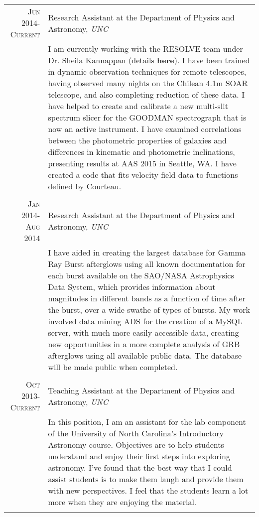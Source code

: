 \documentclass[a4paper,10pt]{article} %
\begin{document}
\begin{tabular}{r|p{11cm}}
\textsc{Jun 2014-Current} & Research Assistant at the Department of Physics and Astronomy, \emph{UNC} \\ 
& \footnotesize{I am currently working with the RESOLVE team under Dr. Sheila Kannappan (details \textbf{\href{http://resolve.astro.unc.edu/}{here}}). I have been trained in dynamic observation techniques for remote telescopes, having observed many nights on the Chilean 4.1m SOAR telescope, and also completing reduction of these data. I have helped to create and calibrate a new multi-slit spectrum slicer for the GOODMAN spectrograph that is now an active instrument. I have examined correlations between the photometric properties of galaxies and differences in kinematic and photometric inclinations, presenting results at AAS 2015 in Seattle, WA. I have created a code that fits velocity field data to functions defined by Courteau.}\\
\multicolumn{2}{c}{} \\


\textsc{Jan 2014-Aug 2014} & Research Assistant at the Department of Physics and Astronomy, \emph{UNC} \\ 
& \footnotesize{I have aided in creating the largest database for Gamma Ray Burst afterglows using all known documentation for each burst available on the SAO/NASA Astrophysics Data System, which provides information about magnitudes in different bands as a function of time after the burst, over a wide swathe of types of bursts. My work involved data mining ADS for the creation of a MySQL server, with much more easily accessible data, creating new opportunities in a more complete analysis of GRB afterglows using all available public data. The database will be made public when completed.}\\
\multicolumn{2}{c}{} \\


\textsc{Oct 2013-Current} & Teaching Assistant at the Department of Physics and Astronomy, \emph{UNC} \\
& \footnotesize{In this position, I am an assistant for the lab component of the University of North Carolina's Introductory Astronomy course. Objectives are to help students understand and enjoy their first steps into exploring astronomy. I've found that the best way that I could assist students is to make them laugh and provide them with new perspectives. I feel that the students learn a lot more when they are enjoying the material.}\\
\multicolumn{2}{c}{} \\


\end{tabular}
\end{document}
